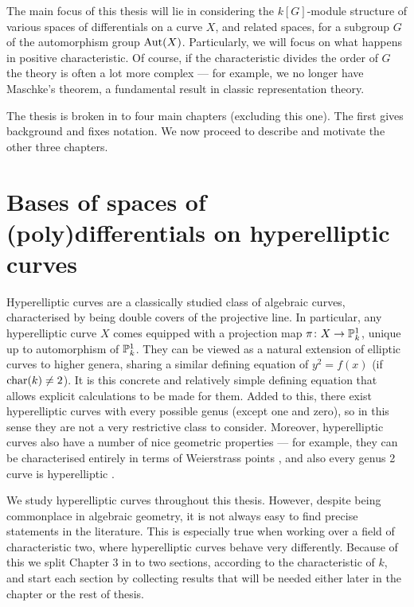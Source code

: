 The main focus of this thesis will lie in considering the $k[G]$-module structure of various spaces of differentials on a curve $X$, and related spaces, for a subgroup $G$ of the automorphism group $\operatorname{Aut}(X)$.
Particularly, we will focus on what happens in positive characteristic.
Of course, if the characteristic divides the order of $G$ the theory is often a lot more complex --- for example, we no longer have Maschke's theorem, a fundamental result in classic representation theory.

The thesis is broken in to four main chapters (excluding this one).
The first gives background and fixes notation.
We now proceed to describe and motivate the other three chapters.

\section{Bases of spaces of (poly)differentials on hyperelliptic curves}

Hyperelliptic curves are a classically studied class of algebraic curves, characterised by being double covers of the projective line.
In particular, any hyperelliptic curve $X$ comes equipped with a projection map $\pi \colon X \rightarrow {\mathbb P}_k^1$, unique up to automorphism of ${\mathbb P}_k^1$.
They can be viewed as a natural extension of elliptic curves to higher genera, sharing a similar defining equation of $y^2 = f(x)$ (if $\operatorname{char}(k) \neq 2$).
It is this concrete and relatively simple defining equation that allows explicit calculations to be made for them.
Added to this, there exist hyperelliptic curves with every possible genus (except one and zero), so in this sense they are not a very restrictive class to consider.
Moreover, hyperelliptic curves also have a number of nice geometric properties --- for example, they can be characterised entirely in terms of Weierstrass points \cite[Chap.\ VII, \S 4, ex.\ R]{miranda}, and also every genus 2 curve is hyperelliptic \cite[Prop.\ 7.4.9]{liu}.

We study hyperelliptic curves throughout this thesis.
However, despite being commonplace in algebraic geometry, it is not always easy to find precise statements in the literature.
This is especially true when working over a field of characteristic two, where hyperelliptic curves behave very differently.
Because of this we split Chapter $3$ in to two sections, according to the characteristic of $k$, and start each section by collecting results that will be needed either later in the chapter or the rest of thesis.

